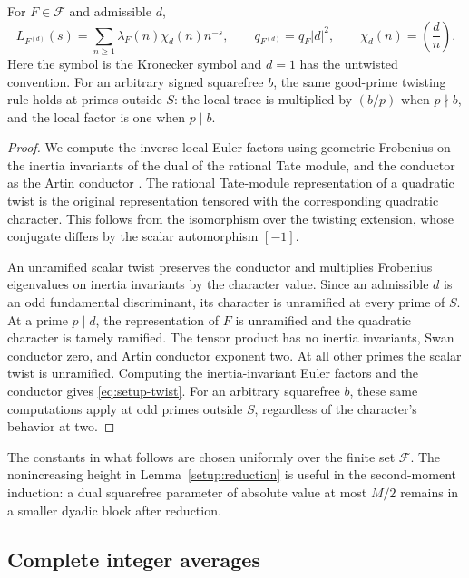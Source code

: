 \begin{lemma}\label{setup:local-factors}
For \(F\in\mathcal F\) and admissible \(d\),
\begin{equation}\label{eq:setup-twist}
 L_{F^{(d)}}(s)=\sum_{n\ge1}\lambda_F(n)\chi_d(n)n^{-s},
 \qquad q_{F^{(d)}}=q_F|d|^2,
 \qquad \chi_d(n)=\left(\frac dn\right).
\end{equation}
Here the symbol is the Kronecker symbol and \(d=1\) has the untwisted
convention. For an arbitrary signed squarefree \(b\), the same good-prime
twisting rule holds at primes outside \(S\): the local trace is multiplied
by \((b/p)\) when \(p\nmid b\), and the local factor is one when \(p\mid b\).
\end{lemma}

\begin{proof}
We compute the inverse local Euler factors using geometric Frobenius
on the inertia invariants of the dual of the rational Tate module,
and the conductor as the Artin conductor
\cite[Definitions~17--18 and Theorem~19]{DokchitserAnni2014}.
The rational Tate-module representation of a quadratic twist is the
original representation tensored with the corresponding quadratic
character. This follows from the isomorphism over the twisting extension,
whose conjugate differs by the scalar automorphism \([-1]\).

An unramified scalar twist preserves the conductor and multiplies
Frobenius eigenvalues on inertia invariants by the character value.
Since an admissible \(d\) is an odd fundamental discriminant, its character
is unramified at every prime of \(S\).
At a prime \(p\mid d\), the representation of \(F\) is unramified and the
quadratic character is tamely ramified. The tensor product has no inertia
invariants, Swan conductor zero, and Artin conductor exponent two.
At all other primes the scalar twist is unramified.
Computing the inertia-invariant Euler factors and the conductor gives
\eqref{eq:setup-twist}.
For an arbitrary squarefree \(b\), these same computations apply at odd
primes outside \(S\), regardless of the character's behavior at two.
\end{proof}

The constants in what follows are chosen uniformly over the finite set
\(\mathcal F\).
The nonincreasing height in Lemma~\ref{setup:reduction} is useful in the
second-moment induction: a dual squarefree parameter of absolute value
at most \(M/2\) remains in a smaller dyadic block after reduction.

\subsection{Complete integer averages}

